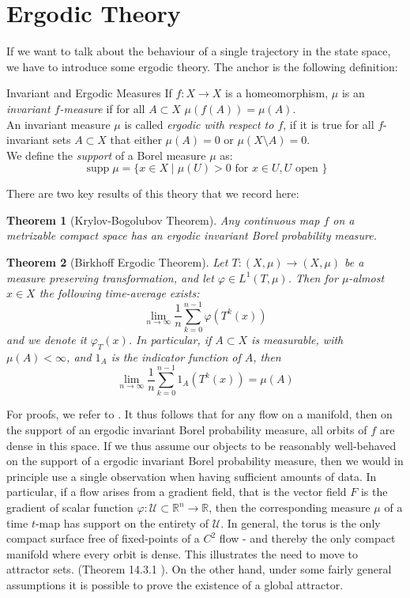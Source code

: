 \documentclass[11pt, a4paper]{memoir}
\theoremstyle{break}
\newtheorem{thm}{Theorem}
\theoremstyle{break}
\theoremstyle{nonumberplain}
\newcommand{\mR}{\mathbb{R}}
\DeclareMathOperator{\supp}{supp}
\begin{document}
\section{Ergodic Theory}
If we want to talk about the behaviour of a single trajectory in the state space, we have to introduce some ergodic theory. The anchor is the following definition:
\begin{mydefinition}{Invariant and Ergodic Measures}
If $f:X\to X$ is a homeomorphism, $\mu$ is an \emph{invariant $f$-measure} if for all $A\subset X$ $\mu(f(A))=\mu(A)$.\\[5pt]
An invariant measure $\mu$ is called \emph{ergodic with respect to $f$}, if it is true for all $f$-invariant sets $A\subset X$ that either $\mu(A)=0$ or $\mu(X\setminus A)=0$.\\[5pt]
We define the \emph{support} of a Borel measure $\mu$ as:
$$\supp \mu=\{x\in X\mid \mu(U)>0 \text{ for } x\in U, U \text{ open }\}$$
\end{mydefinition}
There are two key results of this theory that we record here:
\begin{thm}[Krylov-Bogolubov Theorem]
Any continuous map $f$ on a metrizable compact space has an ergodic invariant Borel probability measure.
\end{thm}
\begin{thm}[Birkhoff Ergodic Theorem]
Let $T:(X,\mu)\to (X,\mu)$ be a measure preserving transformation, and let $\varphi\in L^1(T,\mu)$. Then for $\mu$-almost $x\in X$ the following time-average exists:
$$\lim_{n\to\infty}\frac{1}{n}\sum_{k=0}^{n-1}\varphi(T^k(x))$$
and we denote it $\varphi_T(x)$. In particular, if $A\subset X$ is measurable, with $\mu(A)<\infty$, and $1_A$ is the indicator function of $A$, then
$$\lim_{n\to\infty}\frac{1}{n}\sum_{k=0}^{n-1}1_A(T^k(x))=\mu(A)$$
\end{thm}
For proofs, we refer to \cite{Katok}. It thus follows that for any flow on a manifold, then on the support of an ergodic invariant Borel probability measure, all orbits of $f$ are dense in this space. If we thus assume our objects to be reasonably well-behaved on the support of a ergodic invariant Borel probability measure, then we would in principle use a single observation when having sufficient amounts of data. In particular, if a flow arises from a gradient field, that is the vector field $F$ is the gradient of scalar function $\varphi: \mathcal{U}\subset \mR^n\to \mR$, then the corresponding measure $\mu$ of a time $t$-map has support on the entirety of $\mathcal{U}$. In general, the torus is the only compact surface free of fixed-points of a $C^2$ flow - and thereby the only compact manifold where every orbit is dense. This illustrates the need to move to attractor sets. (Theorem 14.3.1 \cite{Katok}). On the other hand, under some fairly general assumptions it is possible to prove the existence of a global attractor.
\end{document}
